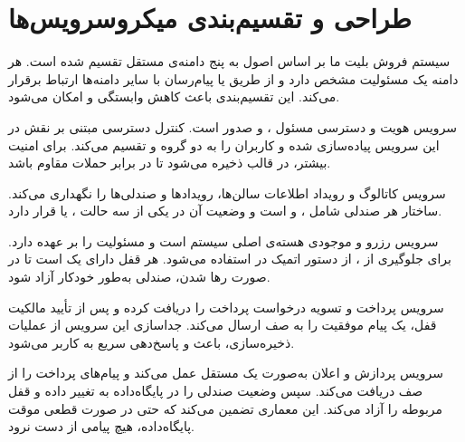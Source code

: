 \documentclass{article}
\begin{document}
\section{طراحی و تقسیم‌بندی میکروسرویس‌ها}

سیستم فروش بلیت ما بر اساس اصول  به پنج دامنه‌ی مستقل تقسیم شده است. هر دامنه یک مسئولیت مشخص دارد و از طریق  یا پیام‌رسان  با سایر دامنه‌ها ارتباط برقرار می‌کند. این تقسیم‌بندی باعث کاهش وابستگی و امکان  می‌شود.

سرویس هویت و دسترسی مسئول ،  و صدور  است. کنترل دسترسی مبتنی بر نقش در این سرویس پیاده‌سازی شده و کاربران را به دو گروه  و  تقسیم می‌کند. برای امنیت بیشتر،  در قالب  ذخیره می‌شود تا در برابر حملات  مقاوم باشد.

سرویس کاتالوگ و رویداد اطلاعات سالن‌ها، رویدادها و صندلی‌ها را نگهداری می‌کند. ساختار هر صندلی شامل ،  و  است و وضعیت آن در یکی از سه حالت ،  یا  قرار دارد.

سرویس رزرو و موجودی هسته‌ی اصلی سیستم است و مسئولیت  را بر عهده دارد. برای جلوگیری از ، از دستور اتمیک  در  استفاده می‌شود. هر قفل دارای یک  است تا در صورت رها شدن، صندلی به‌طور خودکار آزاد شود.

سرویس پرداخت و تسویه درخواست پرداخت را دریافت کرده و پس از تأیید مالکیت قفل، یک پیام موفقیت را به صف  ارسال می‌کند. جداسازی این سرویس از عملیات ذخیره‌سازی، باعث  و پاسخ‌دهی سریع به کاربر می‌شود.

سرویس پردازش و اعلان به‌صورت یک  مستقل عمل می‌کند و پیام‌های پرداخت را از صف دریافت می‌کند. سپس وضعیت صندلی را در پایگاه‌داده به  تغییر داده و قفل مربوطه را آزاد می‌کند. این معماری  تضمین می‌کند که حتی در صورت قطعی موقت پایگاه‌داده، هیچ پیامی از دست نرود.
\end{document}
